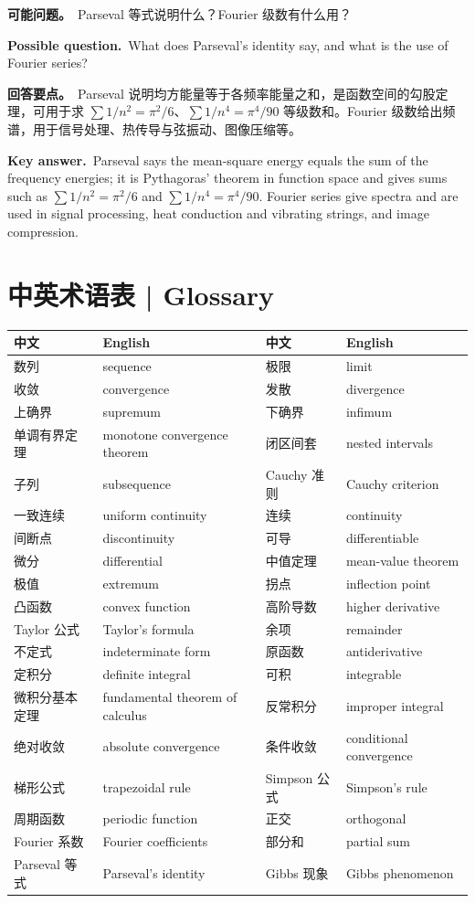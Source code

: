\documentclass[UTF8,11pt,a4paper]{ctexart}
\newcommand{\ASK}[4]{\begin{samepage}\par\noindent\textbf{可能问题。}\ #1\par\noindent\textbf{Possible question.}\ #2\par\noindent\textbf{回答要点。}\ #3\par\noindent\textbf{Key answer.}\ #4\medskip\end{samepage}}
\begin{document}
\ASK{Parseval 等式说明什么？Fourier 级数有什么用？}{What does Parseval's identity say, and what is the use of Fourier series?}{Parseval 说明均方能量等于各频率能量之和，是函数空间的勾股定理，可用于求 $\sum1/n^2=\pi^2/6$、$\sum1/n^4=\pi^4/90$ 等级数和。Fourier 级数给出频谱，用于信号处理、热传导与弦振动、图像压缩等。}{Parseval says the mean-square energy equals the sum of the frequency energies; it is Pythagoras' theorem in function space and gives sums such as $\sum1/n^2=\pi^2/6$ and $\sum1/n^4=\pi^4/90$. Fourier series give spectra and are used in signal processing, heat conduction and vibrating strings, and image compression.}

\section*{中英术语表 | Glossary}
\begingroup\small
\setlength{\tabcolsep}{4pt}
\renewcommand{\arraystretch}{1.12}
\begin{tabular}{p{2.6cm}p{4.8cm}p{2.6cm}p{4.8cm}}
\hline
\textbf{中文} & \textbf{English} & \textbf{中文} & \textbf{English}\\
\hline
数列 & sequence & 极限 & limit\\
收敛 & convergence & 发散 & divergence\\
上确界 & supremum & 下确界 & infimum\\
单调有界定理 & monotone convergence theorem & 闭区间套 & nested intervals\\
子列 & subsequence & Cauchy 准则 & Cauchy criterion\\
一致连续 & uniform continuity & 连续 & continuity\\
间断点 & discontinuity & 可导 & differentiable\\
微分 & differential & 中值定理 & mean-value theorem\\
极值 & extremum & 拐点 & inflection point\\
凸函数 & convex function & 高阶导数 & higher derivative\\
Taylor 公式 & Taylor's formula & 余项 & remainder\\
不定式 & indeterminate form & 原函数 & antiderivative\\
定积分 & definite integral & 可积 & integrable\\
微积分基本定理 & fundamental theorem of calculus & 反常积分 & improper integral\\
绝对收敛 & absolute convergence & 条件收敛 & conditional convergence\\
梯形公式 & trapezoidal rule & Simpson 公式 & Simpson's rule\\
周期函数 & periodic function & 正交 & orthogonal\\
Fourier 系数 & Fourier coefficients & 部分和 & partial sum\\
Parseval 等式 & Parseval's identity & Gibbs 现象 & Gibbs phenomenon\\
\hline
\end{tabular}
\endgroup
\end{document}
